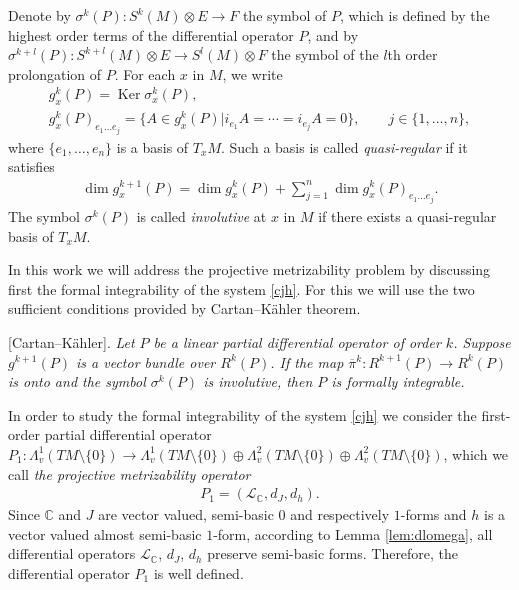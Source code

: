 Denote by $\sigma^k(P): S^k(M)\otimes E \to F$ the symbol of $P$,
which is def\/ined by the highest order terms of the dif\/ferential operator
$P$, and by $\sigma^{k+l}(P): S^{k+l}(M)\otimes E \to S^l(M)
\otimes F$ the symbol of the $l$th order prolongation of $P$. For
each $x$ in $M$, we write
\begin{gather*}
g^k_x(P) = \operatorname{Ker}\sigma^k_x(P),
\\ g^k_x(P)_{e_1\dots e_j}  =  \{A \in g^k_x(P)| i_{e_1}A=\cdots =
i_{e_j}A=0\},\qquad j\in \{1,\dots ,n\},
\end{gather*}
where  $\{e_1,\dots ,e_n\}$ is a basis of $T_xM$. Such a basis is
called \emph{quasi-regular} if it satisf\/ies
\begin{gather} \dim g^{k+1}_x(P)= \dim g^k_x(P) + \sum_{j=1}^n \dim
g^k_x(P)_{e_1\dots e_j}. \label{quasir}\end{gather} The symbol
$\sigma^k(P)$ is called \emph{involutive} at
$x$ in $M$ if there exists a quasi-regular basis of $T_xM$.

In this work we will address the projective metrizability problem by
discussing f\/irst the formal integrability of the system \eqref{cjh}. For
this we will use the two suf\/f\/icient conditions provided by
Cartan--K\"ahler theorem.

\medskip

 [Cartan--K\"ahler]. {\it Let $P$ be a linear partial
differential operator of order $k$. Suppose $g^{k+1}(P)$ is a
vector bundle over $R^k(P)$. If the map $\overline{\pi}^k:
R^{k+1}(P) \to R^k(P)$ is onto and the symbol $\sigma^k(P)$ is involutive, then
$P$ is formally integrable.}

\medskip

In order to study the formal integrability of the system
\eqref{cjh} we consider the f\/irst-order partial dif\/ferential operator $P_1:
\Lambda^1_v(TM\setminus\{0\}) \to \Lambda^1_v(TM\setminus\{0\})
\oplus \Lambda^2_v(TM\setminus\{0\}) \oplus
\Lambda^2_v(TM\setminus\{0\})$, which we call \emph{the projective
  metrizability operator}
\begin{gather}
\label{p1} P_1  = \left({\mathcal L}_{\mathbb C}, d_J, d_h
\right).
\end{gather}
Since $\mathbb{C} $ and $J$ are vector valued, semi-basic $0$ and
respectively $1$-forms and
$h$ is a vector valued almost semi-basic $1$-form,  according to Lemma \ref{lem:dlomega}, all dif\/ferential
operators $\mathcal{L}_{\mathbb{C}}$, $d_J$, $d_h$ preserve
semi-basic forms. Therefore, the dif\/ferential operator $P_1$ is well
def\/ined.


